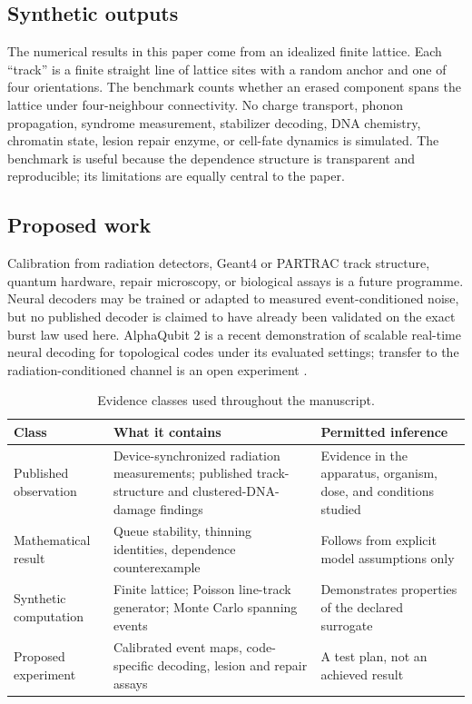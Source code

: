 \documentclass[11pt,a4paper,oneside]{article}
\begin{document}
\subsection{Synthetic outputs}
The numerical results in this paper come from an idealized finite lattice. Each ``track'' is a finite straight line of lattice sites with a random anchor and one of four orientations. The benchmark counts whether an erased component spans the lattice under four-neighbour connectivity. No charge transport, phonon propagation, syndrome measurement, stabilizer decoding, DNA chemistry, chromatin state, lesion repair enzyme, or cell-fate dynamics is simulated. The benchmark is useful because the dependence structure is transparent and reproducible; its limitations are equally central to the paper.

\subsection{Proposed work}
Calibration from radiation detectors, Geant4 or PARTRAC track structure, quantum hardware, repair microscopy, or biological assays is a future programme. Neural decoders may be trained or adapted to measured event-conditioned noise, but no published decoder is claimed to have already been validated on the exact burst law used here. AlphaQubit 2 is a recent demonstration of scalable real-time neural decoding for topological codes under its evaluated settings; transfer to the radiation-conditioned channel is an open experiment \citep{Senior2025}.

\begin{table}[t]\centering\small\caption{Evidence classes used throughout the manuscript.}\label{tab:evidence}\begin{tabularx}{\linewidth}{p{.18\linewidth}X p{.23\linewidth}}\toprule
Class & What it contains & Permitted inference\\\midrule
Published observation & Device-synchronized radiation measurements; published track-structure and clustered-DNA-damage findings & Evidence in the apparatus, organism, dose, and conditions studied\\
Mathematical result & Queue stability, thinning identities, dependence counterexample & Follows from explicit model assumptions only\\
Synthetic computation & Finite lattice; Poisson line-track generator; Monte Carlo spanning events & Demonstrates properties of the declared surrogate\\
Proposed experiment & Calibrated event maps, code-specific decoding, lesion and repair assays & A test plan, not an achieved result\\\bottomrule\end{tabularx}\end{table}
\end{document}
